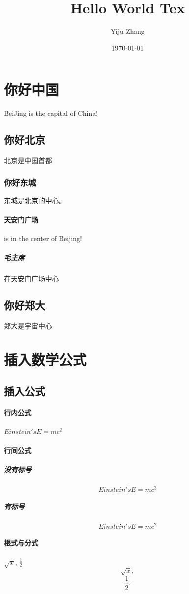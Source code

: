 \documentclass[UTF8]{ctexart}
\title{Hello World Tex}
\author{Yiju Zhang}
\date{\today}
\begin{document}
\maketitle
\tableofcontents

\section{你好中国}
BeiJing is the capital of China!
\subsection{你好北京}
北京是中国首都
\subsubsection{你好东城}
东城是北京的中心。
\paragraph{天安门广场}
is in the center of Beijing!
\subparagraph{毛主席}
在天安门广场中心
\subsection{你好郑大}
郑大是宇宙中心

\section{插入数学公式}

\subsection{插入公式}
\paragraph{行内公式}
$Einstein 's  E=mc^2$
\paragraph{行间公式}
\subparagraph{没有标号}
\[Einstein 's  E=mc^2\]
\subparagraph{有标号}
\begin{equation}
Einstein 's  E=mc^2
\end{equation}
\paragraph{根式与分式}
$\sqrt{x}$, $\tfrac{1}{2}$
\[\sqrt{x},\]
\[\frac{1}{2}.\]
\end{document}
